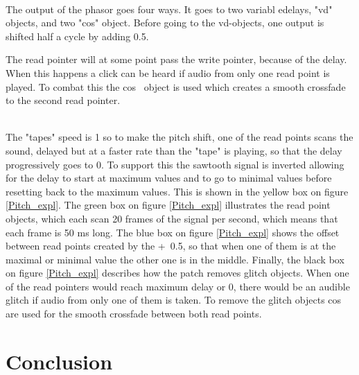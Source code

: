 \begin{minipage}{\linewidth}%
\label{sawtoothPic}
\end{minipage}\\

The output of the phasor goes four ways. It goes to two variabl edelays, "vd" objects, and two "cos" object. Before going to the vd-objects, one output is shifted half a cycle by adding 0.5. 



The read pointer will at some point pass the write pointer, because of the delay. When this happens a click can be heard if audio from only one read point is played. To combat this the cos~ object is used which creates a smooth crossfade to the second read pointer.


\begin{minipage}{\linewidth}%
\label{Pitch_expl}
\end{minipage}\\

The "tapes" speed is 1 so to make the pitch shift, one of the read points scans the sound, delayed but at a faster rate than the "tape" is playing, so that the delay progressively goes to 0. To support this the sawtooth signal is inverted allowing for the delay to start at maximum values and to go to minimal values before resetting back to the maximum values. This is shown in the yellow box on figure \ref{Pitch_expl}. The green box on figure \ref{Pitch_expl} illustrates the read point objects, which each scan 20 frames of the signal per second, which means that each frame is 50 ms long.
The blue box on figure \ref{Pitch_expl} shows the offset between read points created by the +~0.5, so that when one of them is at the maximal or minimal value the other one is in the middle.
Finally, the black box on figure \ref{Pitch_expl} describes how the patch removes glitch objects. When one of the read pointers would reach maximum delay or 0, there would be an audible glitch if audio from only one of them is taken. To remove the glitch objects cos~ are used for the smooth crossfade between both read points. 

\section{Conclusion}

